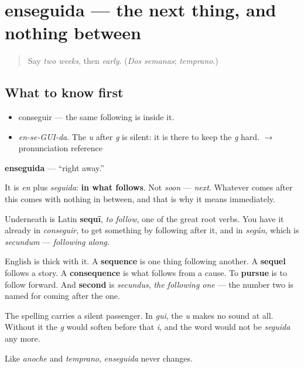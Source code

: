 \section[enseguida]{enseguida — the next thing, and nothing between}

\label{lesson:ES-C322-enseguida}



\begin{quote}
Say \emph{two weeks}, then \emph{early}. (\emph{Dos semanas}; \emph{temprano}.)
\end{quote}

\subsection*{What to know first}
\begin{itemize}
\raggedright
  \item conseguir — the same following is inside it.
\end{itemize}

\begin{sounds}
\begin{itemize}
\raggedright
  \item \emph{en-se-GUI-da}. The \emph{u} after \emph{g} is silent: it is there to keep the \emph{g} hard. $\to$ pronunciation reference
\end{itemize}
\end{sounds}

\begin{cousinweb}
\textbf{enseguida} — \textquotedblleft{}right away.\textquotedblright{}

It is \emph{en} plus \emph{seguida}: \textbf{in what follows}. Not \emph{soon} — \emph{next}. Whatever comes after this comes with nothing in between, and that is why it means immediately.

Underneath is Latin \textbf{sequī}, \emph{to follow}, one of the great root verbs. You have it already in \emph{conseguir}, to get something by following after it, and in \emph{según}, which is \emph{secundum} — \emph{following along}.

English is thick with it. A \textbf{sequence} is one thing following another. A \textbf{sequel} follows a story. A \textbf{consequence} is what follows from a cause. To \textbf{pursue} is to follow forward. And \textbf{second} is \emph{secundus}, \emph{the following one} — the number two is named for coming after the one.

The spelling carries a silent passenger. In \emph{gui}, the \emph{u} makes no sound at all. Without it the \emph{g} would soften before that \emph{i}, and the word would not be \emph{seguida} any more.

Like \emph{anoche} and \emph{temprano}, \emph{enseguida} never changes.
\end{cousinweb}


